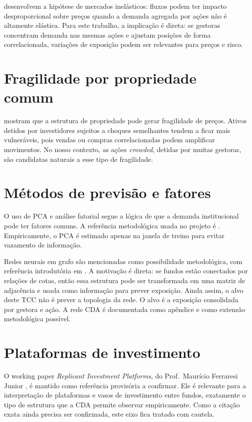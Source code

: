 \documentclass[12pt,a4paper]{report}
\begin{document}
\citet{gabaixkoijen2021} desenvolvem a hipótese de mercados inelásticos: fluxos podem ter impacto
desproporcional sobre preços quando a demanda agregada por ações não é altamente elástica. Para este
trabalho, a implicação é direta: se gestoras concentram demanda nas mesmas ações e ajustam posições de forma
correlacionada, variações de exposição podem ser relevantes para preços e risco.

\section{Fragilidade por propriedade comum}

\citet{greenwoodthesmar2011} mostram que a estrutura de propriedade pode gerar fragilidade de preços.
Ativos detidos por investidores sujeitos a choques semelhantes tendem a ficar mais vulneráveis, pois vendas
ou compras correlacionadas podem amplificar movimentos. No nosso contexto, as ações \emph{crowded}, detidas
por muitas gestoras, são candidatas naturais a esse tipo de fragilidade.

\section{Métodos de previsão e fatores}

O uso de PCA e análise fatorial segue a lógica de que a demanda institucional pode ter fatores comuns. A
referência metodológica usada no projeto é \citet{artesbarroso2023}. Empiricamente, o PCA é estimado apenas
na janela de treino para evitar vazamento de informação.

Redes neurais em grafo são mencionadas como possibilidade metodológica, com referência introdutória em
\citet{sanchezlengeling2021}. A motivação é direta: se fundos estão conectados por relações de cotas, então
essa estrutura pode ser transformada em uma matriz de adjacência e usada como informação para prever
exposição. Ainda assim, o alvo deste TCC não é prever a topologia da rede. O alvo é a exposição consolidada
por gestora e ação. A rede CDA é documentada como apêndice e como extensão metodológica possível.

\section{Plataformas de investimento}

O working paper \emph{Replicant Investment Platforms}, do Prof.\ Maurício Ferraresi Junior
\citep{ferraresi_replicant}, é mantido como referência provisória a confirmar. Ele é relevante para a
interpretação de plataformas e vasos de investimento entre fundos, exatamente o tipo de estrutura que a CDA
permite observar empiricamente. Como a citação exata ainda precisa ser confirmada, este eixo fica tratado com
cautela.
\end{document}
